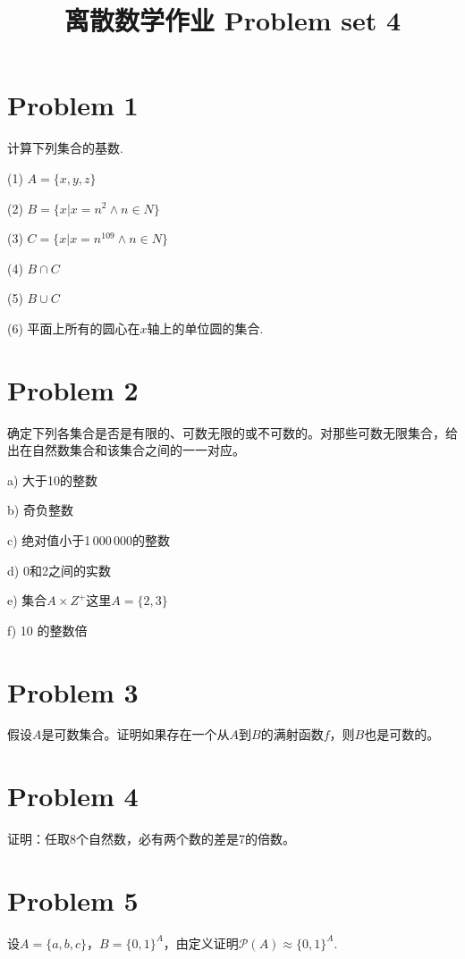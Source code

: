 \documentclass[a4paper]{article}
\begin{document}
\begin{CJK*}{GBK}{song}
\title{\textbf{\fontsize{20pt}{\baselineskip}\selectfont 离散数学作业 Problem set 4}}

\section*{Problem 1}
计算下列集合的基数.
\begin{description}
\item (1) $A=\{x,y,z\} $
\item (2) $B=\{x|x=n^2\wedge n\in N\}$
\item (3) $C=\{x|x=n^{109}\wedge n\in N\}$
\item (4) $B\cap C$
\item (5) $B\cup C$
\item (6) 平面上所有的圆心在$x$轴上的单位圆的集合.
\end{description}

\section*{Problem 2}
确定下列各集合是否是有限的、可数无限的或不可数的。对那些可数无限集合，给出在自然数集合和该集合之间的一一对应。

\begin{description}
\item a) 大于10的整数
\item b) 奇负整数
\item c) 绝对值小于1\,000\,000的整数
\item d) 0和2之间的实数
\item e) 集合$A\times Z^+$这里$A=\{2,3\}$
\item f) 10 的整数倍
\end{description}

\section*{Problem 3}
假设$A$是可数集合。证明如果存在一个从$A$到$B$的满射函数$f$，则$B$也是可数的。

\section*{Problem 4}
证明：任取8个自然数，必有两个数的差是7的倍数。

\section*{Problem 5}
设$A=\{a,b,c\}$，$B=\{0,1\}^A$，由定义证明$\mathcal P(A)\approx \{0,1\}^A$.


\end{CJK*}
\end{document}
